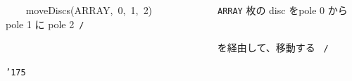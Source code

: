\documentclass[a4paper,10pt]{article}
\def\mc{\relax}
\begin{document}
\noindent
\mbox{}{\tt\mc \ }{\tt\mc \ }{\tt\mc \ }{\tt\mc \ }moveDiscs(ARRAY,{\tt\mc \ }0,{\tt\mc \ }1,{\tt\mc \ }2){\tt\mc \ }{\tt\mc \ }{\tt\mc \ }{\tt\mc \ }{\tt\mc \ }{\tt\mc \ }{\tt\mc \ }{\tt\mc \ }{\tt\mc \ }{\tt\mc \ }{\tt\mc \ }\rm\mc {\tt /}{\tt *}\  \ {\tt ARRAY} 枚の disc をpole 0 から pole 1 に pole 2\hfill \rm\mc \ {\tt *}{\tt /}
\tt\mc 

\noindent
\mbox{}{\tt\mc \ }{\tt\mc \ }{\tt\mc \ }{\tt\mc \ }{\tt\mc \ }{\tt\mc \ }{\tt\mc \ }{\tt\mc \ }{\tt\mc \ }{\tt\mc \ }{\tt\mc \ }{\tt\mc \ }{\tt\mc \ }{\tt\mc \ }{\tt\mc \ }{\tt\mc \ }{\tt\mc \ }{\tt\mc \ }{\tt\mc \ }{\tt\mc \ }{\tt\mc \ }{\tt\mc \ }{\tt\mc \ }{\tt\mc \ }{\tt\mc \ }{\tt\mc \ }{\tt\mc \ }{\tt\mc \ }{\tt\mc \ }{\tt\mc \ }{\tt\mc \ }{\tt\mc \ }{\tt\mc \ }{\tt\mc \ }{\tt\mc \ }{\tt\mc \ }{\tt\mc \ }{\tt\mc \ }{\tt\mc \ }{\tt\mc \ }\rm\mc {\tt /}{\tt *}\  \ を経由して、移動する \hfill \rm\mc \ {\tt *}{\tt /}
\tt\mc 

\noindent
\mbox{}{\tt\char'175}

\rm\mc
\end{document}
